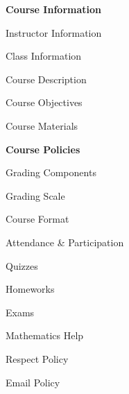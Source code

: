 \documentclass[11pt,letterpaper]{article}
\begin{document}
\mytitle




\begin{minipage}[t]{0.45\textwidth}
{\bfseries\color{stacred} Course Information} \dotfill \pageref{course_info} \par
\hspace{0.3cm} Instructor Information \dotfill \pageref{instr_info} \par
\hspace{0.3cm} Class Information \dotfill \pageref{class_info} \par
\hspace{0.3cm} Course Description \dotfill \pageref{course_desc} \par
\hspace{0.3cm} Course Objectives \dotfill \pageref{course_obj} \par
\hspace{0.3cm} Course Materials \dotfill \pageref{course_mat} \par
{\bfseries\color{stacred} Course Policies} \dotfill \pageref{course_polc} \par
\hspace{0.3cm} Grading Components \dotfill \pageref{grade_comp} \par
\hspace{0.3cm} Grading Scale \dotfill \pageref{grade_scale} \par
\hspace{0.3cm} Course Format \dotfill \pageref{course_form} \par
\hspace{0.3cm} Attendance \& Participation \dotfill \pageref{attend} \par
\hspace{0.3cm} Quizzes \dotfill \pageref{quiz} \par
\hspace{0.3cm} Homeworks \dotfill \pageref{hw} \par
\hspace{0.3cm} Exams \dotfill \pageref{exams} \par
\hspace{0.3cm} Mathematics Help \dotfill \pageref{help} \par
\hspace{0.3cm} Respect Policy \dotfill \pageref{respect} \par
\hspace{0.3cm} Email Policy \dotfill \pageref{email_policy} \par 

\end{minipage}
\end{document}
